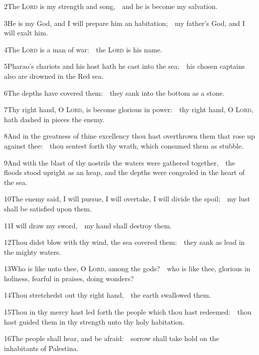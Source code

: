 
2\enspace The {\scshape Lord} is my strength and song,\ \star\ and he is become my salvation.

3\enspace He is my God, and I will prepare him an habitation;\ \star\ my father’s God, and I will exalt him.

4\enspace The {\scshape Lord} is a man of war:\ \star\ the {\scshape Lord} is his name.

5\enspace Pharao’s chariots and his host hath he cast into the sea:\ \star\ his chosen captains also are drowned in the Red sea.

6\enspace The depths have covered them:\ \star\ they sank into the bottom as a stone.

7\enspace Thy right hand, O {\scshape Lord}, is become glorious in power:\ \star\ thy right hand, O {\scshape Lord}, hath dashed in pieces the enemy.

8\enspace And in the greatness of thine excellency thou hast overthrown them that rose up against thee:\ \star\ thou sentest forth thy wrath, which consumed them as stubble.

9\enspace And with the blast of thy nostrils the waters were gathered together,\ \star\ the floods stood upright as an heap, and the depths were congealed in the heart of the sea.

10\enspace The enemy said, I will pursue, I will overtake, I will divide the spoil;\ \star\ my lust shall be satisfied upon them.

11\enspace I will draw my sword,\ \star\ my hand shall destroy them.

12\enspace Thou didst blow with thy wind, the sea covered them:\ \star\ they sank as lead in the mighty waters.

13\enspace Who is like unto thee, O {\scshape Lord}, among the gods?\ \star\ who is like thee, glorious in holiness, fearful in praises, doing wonders?

14\enspace Thou stretchedst out thy right hand,\ \star\ the earth swallowed them.

15\enspace Thou in thy mercy hast led forth the people which thou hast redeemed:\ \star\ thou hast guided them in thy strength unto thy holy habitation.

16\enspace The people shall hear, and be afraid:\ \star\ sorrow shall take hold on the inhabitants of Palestina.

